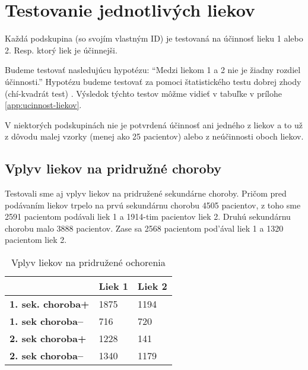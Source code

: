 \section{Testovanie jednotlivých liekov}

Každá podskupina (so svojím vlastným ID) je testovaná na účinnosť lieku 1 alebo 2. Resp. ktorý liek je účinnejši.

Budeme testovať nasledujúcu hypotézu: ``Medzi liekom 1 a 2 nie je žiadny rozdiel účinnosti.'' Hypotézu budeme testovať za pomoci štatistického testu dobrej zhody (chí-kvadrát test) \cite{bib:wiki-chi-squared} \cite{bib:biomedicina-statistika}. Výsledok týchto testov môžme vidieť v tabuľke v prílohe \ref{app:ucinnost-liekov}.

V niektorých podskupinách nie je potvrdená účinnosť ani jedného z liekov a to už z dôvodu malej vzorky (menej ako 25 pacientov) alebo z neúčinnosti oboch liekov.


\subsection{Vplyv liekov na pridružné choroby}

Testovali sme aj vplyv liekov na pridružené sekundárne choroby. Pričom pred podávaním liekov trpelo na prvú sekundárnu chorobu 4505 pacientov, z toho sme 2591 pacientom podávali liek 1 a 1914-tim pacientov liek 2. Druhú sekundárnu chorobu malo 3888 pacientov. Zase sa 2568 pacientom pod'ával liek 1 a 1320 pacientom liek 2.

\begin{table}[h!]
\centering
\begin{tabular}{l|ll}
\hline
                          & \textbf{Liek 1} & \textbf{Liek 2} \\ \hline
\textbf{1. sek. choroba+} &   1875              &      1194          \\ \hline
\textbf{1. sek choroba--} &     716               &      720           \\ \hline
\textbf{2. sek choroba+}  &    1228             &      141           \\ \hline
\textbf{2. sek choroba--} &     1340             &      1179           \\ \hline
\end{tabular}
\caption{Vplyv liekov na pridružené ochorenia}
\label{tab:sekundarne-ochorenia}
\end{table}